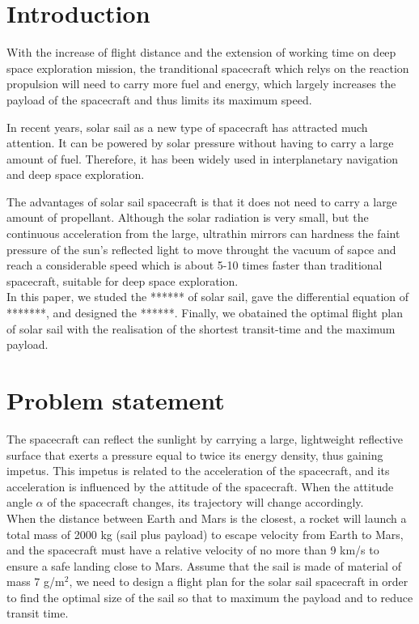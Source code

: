 \documentclass[../Paper.tex]{subfiles}
\begin{document}
\section{Introduction}	


With the increase of flight distance and the extension of working time on deep space exploration mission, the tranditional spacecraft which relys on the reaction propulsion will need to carry more fuel and energy, which largely increases the payload of the spacecraft and thus limits its maximum speed.            

In recent years, solar sail as a new type of spacecraft has attracted much attention. It can be powered by solar pressure without having to carry a large amount of fuel. Therefore, it has been widely used in interplanetary navigation and deep space exploration. 


The advantages of solar sail spacecraft is that it does not need to carry a large amount of propellant. Although the solar radiation is very small, but the continuous acceleration from the large, ultrathin mirrors can hardness the faint pressure of the sun's reflected light to move throught the vacuum of sapce and reach a considerable speed which is about 5-10 times faster than traditional spacecraft, suitable for deep space exploration.            
\\

In this paper, we studed the ****** of solar sail, gave the differential equation of *******, and designed the ******. Finally, we obatained the optimal flight plan of solar sail with the realisation of the shortest transit-time and the maximum payload. 

\section{Problem statement}

The spacecraft can reflect the sunlight by carrying a large, lightweight reflective surface that exerts a pressure equal to twice its energy density, thus gaining impetus. This impetus is related to the acceleration of the spacecraft, and its acceleration is influenced by the attitude of the spacecraft. When the attitude angle $\alpha$ of the spacecraft changes, its trajectory will change accordingly. 
\\

When the distance between Earth and Mars is the closest, a rocket will launch a total mass of 2000 kg (sail plus payload) to escape velocity from Earth to Mars, and the spacecraft must have a relative velocity of no more than 9 km/s to ensure a safe landing close to Mars. Assume that the sail is made of material of mass 7 g/m$^2$, we need to design a flight plan for the solar sail spacecraft in order to find the optimal size of the sail so that to maximum the payload and to reduce transit time.
\end{document}

